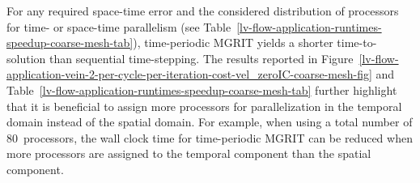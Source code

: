 \documentclass[3p]{elsarticle}
\newlength\figureheight
\newlength\figurewidth
\begin{document}
For any required space-time error and the considered distribution of processors for time-
or space-time parallelism (see Table~\ref{lv-flow-application-runtimes-speedup-coarse-mesh-tab}),
time-periodic MGRIT yields a shorter time-to-solution than sequential time-stepping.
The results reported in Figure~\ref{lv-flow-application-vein-2-per-cycle-per-iteration-cost-vel_zeroIC-coarse-mesh-fig}
and Table~\ref{lv-flow-application-runtimes-speedup-coarse-mesh-tab}
further highlight that it is beneficial to assign more processors for parallelization in the temporal domain
instead of the spatial domain.
For example, when using a total number of $80$~processors,
the wall clock time for time-periodic MGRIT can be reduced when more processors are assigned
to the temporal component than the spatial component.
\setlength{\figurewidth}{0.5\textwidth}
\setlength{\figureheight}{0.2\textwidth}
\end{document}
